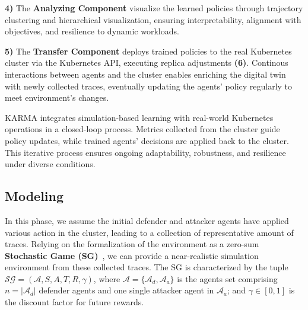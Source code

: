 \documentclass[conference]{IEEEtran}
\begin{document}
\textbf{4)} The \textbf{Analyzing Component} visualize the learned policies through trajectory clustering and hierarchical visualization, ensuring interpretability, alignment with objectives, and resilience to dynamic workloads.

\textbf{5)} The \textbf{Transfer Component} deploys trained policies to the real Kubernetes cluster via the Kubernetes API, executing replica adjustments \textbf{(6)}. Continous interactions between agents and the cluster enables enriching the digital twin with newly collected traces, eventually updating the agents' policy regularly to meet environment's changes.

KARMA integrates simulation-based learning with real-world Kubernetes operations in a closed-loop process. Metrics collected from the cluster guide policy updates, while trained agents' decisions are applied back to the cluster. This iterative process ensures ongoing adaptability, robustness, and resilience under diverse conditions.


\subsection{Modeling}

In this phase, we assume the initial defender and attacker agents have applied various action in the cluster, leading to a collection of representative amount of traces. Relying on the formalization of the environment as a zero-sum \textbf{Stochastic Game (SG)}~\cite{shapley1953stochastic}, we can provide a near-realistic simulation environment from these collected traces. The SG is characterized by the tuple $\mathcal{SG} = (\mathcal{A}, S, A, T, R, \gamma)$, where $\mathcal{A} = \{\mathcal{A}_d, \mathcal{A}_a\}$ is the agents set comprising $n = |\mathcal{A}_d|$ defender agents and one single attacker agent in $\mathcal{A}_a$; and $\gamma \in [0, 1]$ is the discount factor for future rewards.
\end{document}
